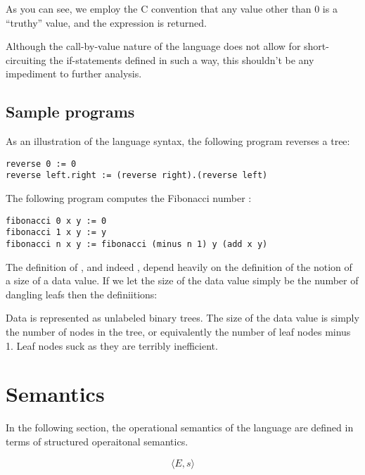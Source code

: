 As you can see, we employ the C convention that any value other than $0$ is a
``truthy'' value, and the expression  is returned.

Although the call-by-value nature of the language does not allow for
short-circuiting the if-statements defined in such a way, this shouldn't be any
impediment to further analysis.

\subsection{Sample programs}

As an illustration of the language syntax, the following program reverses a tree:

\begin{verbatim}
reverse 0 := 0
reverse left.right := (reverse right).(reverse left)
\end{verbatim}

The following program computes the Fibonacci number :

\begin{verbatim}
fibonacci 0 x y := 0
fibonacci 1 x y := y
fibonacci n x y := fibonacci (minus n 1) y (add x y)
\end{verbatim}

The definition of ,  and indeed , depend heavily
on the definition of the notion of a size of a data value. If we let the size
of the data value simply be the number of dangling leafs then the definiitions:

Data is represented as unlabeled binary trees. The size of the data value is
simply the number of nodes in the tree, or equivalently the number of leaf
nodes minus 1. Leaf nodes suck as they are terribly inefficient. 

\section{Semantics}

In the following section, the operational semantics of the language 
are defined in terms of structured operaitonal semantics\cite{sos}.

$$\langle E, s\rangle$$

